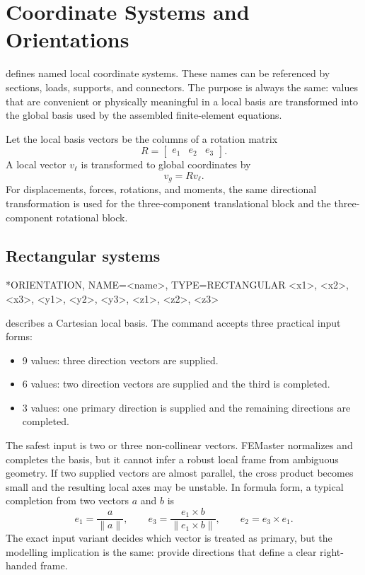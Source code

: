 \chapter{Coordinate Systems and Orientations}
\label{chap:coordinate-systems}

 defines named local coordinate systems. These names can be referenced by sections, loads, supports, and connectors. The purpose is always the same: values that are convenient or physically meaningful in a local basis are transformed into the global basis used by the assembled finite-element equations.

Let the local basis vectors be the columns of a rotation matrix
\[
R =
\begin{bmatrix}
e_1 & e_2 & e_3
\end{bmatrix}.
\]
A local vector \(v_\ell\) is transformed to global coordinates by
\[
v_g = R v_\ell .
\]
For displacements, forces, rotations, and moments, the same directional transformation is used for the three-component translational block and the three-component rotational block.

\section{Rectangular systems}

\begin{syntax}
*ORIENTATION, NAME=<name>, TYPE=RECTANGULAR
<x1>, <x2>, <x3>, <y1>, <y2>, <y3>, <z1>, <z2>, <z3>
\end{syntax}

 describes a Cartesian local basis. The command accepts three practical input forms:
\begin{itemize}
  \item 9 values: three direction vectors are supplied.
  \item 6 values: two direction vectors are supplied and the third is completed.
  \item 3 values: one primary direction is supplied and the remaining directions are completed.
\end{itemize}

The safest input is two or three non-collinear vectors. FEMaster normalizes and completes the basis, but it cannot infer a robust local frame from ambiguous geometry. If two supplied vectors are almost parallel, the cross product becomes small and the resulting local axes may be unstable. In formula form, a typical completion from two vectors \(a\) and \(b\) is
\[
e_1 = \frac{a}{\lVert a\rVert},\qquad
e_3 = \frac{e_1 \times b}{\lVert e_1 \times b\rVert},\qquad
e_2 = e_3 \times e_1 .
\]
The exact input variant decides which vector is treated as primary, but the modelling implication is the same: provide directions that define a clear right-handed frame.

